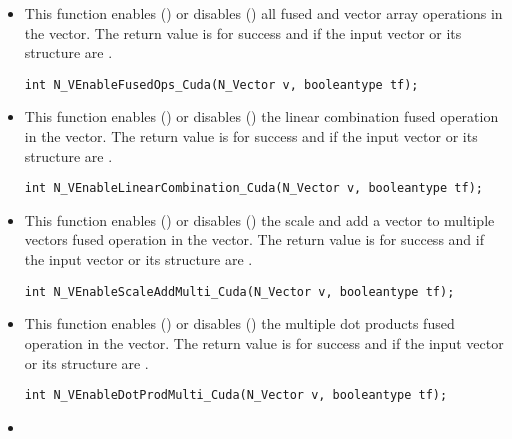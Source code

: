 \begin{itemize}


\item {}

This function enables () or disables () all fused and
vector array operations in the {\cuda} vector. The return value is  for
success and  if the input vector or its  structure are .

\verb|int N_VEnableFusedOps_Cuda(N_Vector v, booleantype tf);|


\item {}

This function enables () or disables () the linear
combination fused operation in the {\cuda} vector. The return value is  for
success and  if the input vector or its  structure are .

\verb|int N_VEnableLinearCombination_Cuda(N_Vector v, booleantype tf);|


\item {}

This function enables () or disables () the scale and
add a vector to multiple vectors fused operation in the {\cuda} vector. The
return value is  for success and  if the input vector or its
 structure are .

\verb|int N_VEnableScaleAddMulti_Cuda(N_Vector v, booleantype tf);|


\item {}

This function enables () or disables () the multiple
dot products fused operation in the {\cuda} vector. The return value is 
for success and  if the input vector or its  structure are
.

\verb|int N_VEnableDotProdMulti_Cuda(N_Vector v, booleantype tf);|


\item {}


\end{itemize}
